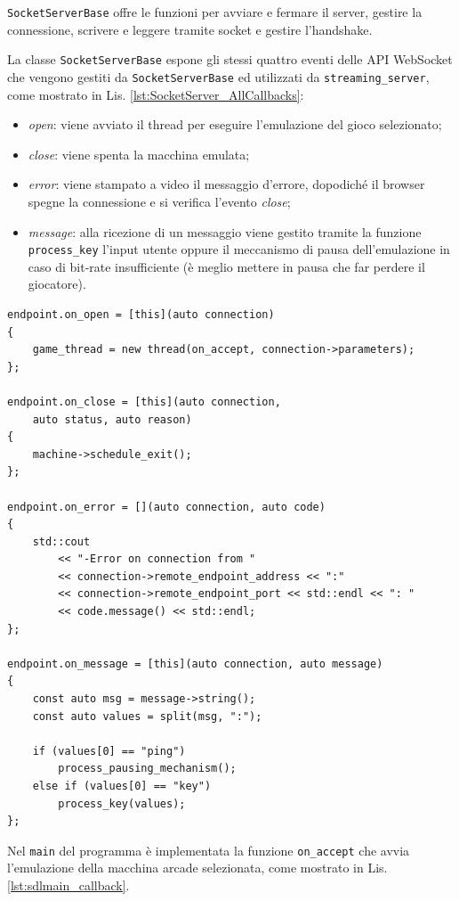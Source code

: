 \verb|SocketServerBase| offre le funzioni per avviare e fermare il server, gestire la connessione, scrivere e leggere tramite socket e gestire l'handshake.

La classe \verb|SocketServerBase| espone gli stessi quattro eventi delle API WebSocket che vengono gestiti da \verb|SocketServerBase| ed utilizzati da \verb|streaming_server|, come mostrato in Lis. \ref{lst:SocketServer_AllCallbacks}:

\begin{itemize}
	\item \textit{open}: viene avviato il thread per eseguire l'emulazione del gioco selezionato;
	\item \textit{close}: viene spenta la macchina emulata;
	\item \textit{error}: viene stampato a video il messaggio d'errore, dopodiché il browser spegne la connessione e si verifica l'evento \textit{close};
	\item \textit{message}: alla ricezione di un messaggio viene gestito tramite la funzione \verb|process_key| l'input utente oppure il meccanismo di pausa dell'emulazione in caso di bit-rate insufficiente (è meglio mettere in pausa che far perdere il giocatore).
\end{itemize}

\begin{lstlisting}[caption=Codice relativo alle callback WebSocket. File: \detokenize{lib/util/streaming_server.hpp}, label={lst:SocketServer_AllCallbacks}]
endpoint.on_open = [this](auto connection)
{
	game_thread = new thread(on_accept, connection->parameters);
};

endpoint.on_close = [this](auto connection,
	auto status, auto reason)
{
	machine->schedule_exit();
};	

endpoint.on_error = [](auto connection, auto code)
{
	std::cout
		<< "-Error on connection from "
		<< connection->remote_endpoint_address << ":"
		<< connection->remote_endpoint_port << std::endl << ": "
		<< code.message() << std::endl;
};

endpoint.on_message = [this](auto connection, auto message)
{
	const auto msg = message->string();
	const auto values = split(msg, ":");

	if (values[0] == "ping")
		process_pausing_mechanism();
	else if (values[0] == "key")
		process_key(values);
};
\end{lstlisting}

Nel \verb|main| del programma è implementata la funzione \verb|on_accept| che avvia l'emulazione della macchina arcade selezionata, come mostrato in Lis. \ref{lst:sdlmain_callback}.

